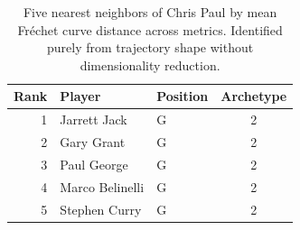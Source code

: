 \begin{table}[htbp]
  \centering\small
  \begin{tabular}{rllc}
    \toprule
    Rank & Player & Position & Archetype \\
    \midrule
    1 & Jarrett Jack & G & 2 \\
    2 & Gary Grant & G & 2 \\
    3 & Paul George & G & 2 \\
    4 & Marco Belinelli & G & 2 \\
    5 & Stephen Curry & G & 2 \\
    \bottomrule
  \end{tabular}
  \caption{Five nearest neighbors of Chris Paul by mean Fr\'{e}chet curve distance across metrics. Identified purely from trajectory shape without dimensionality reduction.}
  \label{tab:Chris_Paul_frechet_curve_neighbors}
\end{table}

